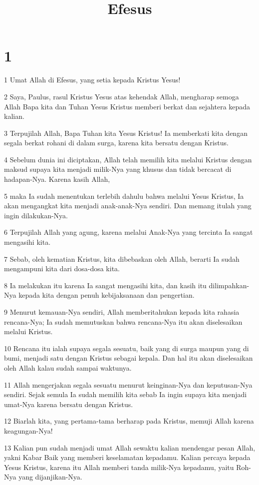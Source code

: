 

\title{Efesus}


\chapter{1}

\par 1 Umat Allah di Efesus, yang setia kepada Kristus Yesus!
\par 2 Saya, Paulus, rasul Kristus Yesus atas kehendak Allah, mengharap semoga Allah Bapa kita dan Tuhan Yesus Kristus memberi berkat dan sejahtera kepada kalian.
\par 3 Terpujilah Allah, Bapa Tuhan kita Yesus Kristus! Ia memberkati kita dengan segala berkat rohani di dalam surga, karena kita bersatu dengan Kristus.
\par 4 Sebelum dunia ini diciptakan, Allah telah memilih kita melalui Kristus dengan maksud supaya kita menjadi milik-Nya yang khusus dan tidak bercacat di hadapan-Nya. Karena kasih Allah,
\par 5 maka Ia sudah menentukan terlebih dahulu bahwa melalui Yesus Kristus, Ia akan mengangkat kita menjadi anak-anak-Nya sendiri. Dan memang itulah yang ingin dilakukan-Nya.
\par 6 Terpujilah Allah yang agung, karena melalui Anak-Nya yang tercinta Ia sangat mengasihi kita.
\par 7 Sebab, oleh kematian Kristus, kita dibebaskan oleh Allah, berarti Ia sudah mengampuni kita dari dosa-dosa kita.
\par 8 Ia melakukan itu karena Ia sangat mengasihi kita, dan kasih itu dilimpahkan-Nya kepada kita dengan penuh kebijaksanaan dan pengertian.
\par 9 Menurut kemauan-Nya sendiri, Allah memberitahukan kepada kita rahasia rencana-Nya; Ia sudah memutuskan bahwa rencana-Nya itu akan diselesaikan melalui Kristus.
\par 10 Rencana itu ialah supaya segala sesuatu, baik yang di surga maupun yang di bumi, menjadi satu dengan Kristus sebagai kepala. Dan hal itu akan diselesaikan oleh Allah kalau sudah sampai waktunya.
\par 11 Allah mengerjakan segala sesuatu menurut keinginan-Nya dan keputusan-Nya sendiri. Sejak semula Ia sudah memilih kita sebab Ia ingin supaya kita menjadi umat-Nya karena bersatu dengan Kristus.
\par 12 Biarlah kita, yang pertama-tama berharap pada Kristus, memuji Allah karena keagungan-Nya!
\par 13 Kalian pun sudah menjadi umat Allah sewaktu kalian mendengar pesan Allah, yakni Kabar Baik yang memberi keselamatan kepadamu. Kalian percaya kepada Yesus Kristus, karena itu Allah memberi tanda milik-Nya kepadamu, yaitu Roh-Nya yang dijanjikan-Nya.
